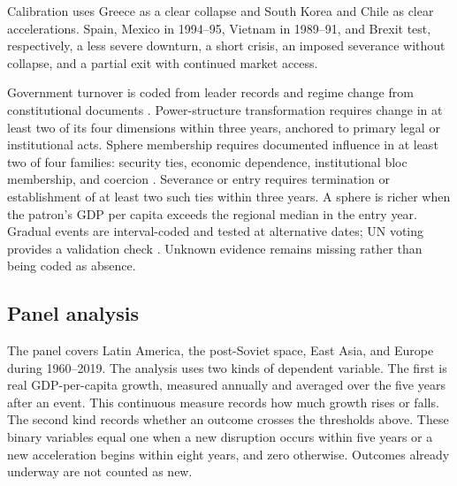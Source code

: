 \documentclass[11pt]{article}
\begin{document}
Calibration uses Greece as a clear collapse and South Korea and Chile as clear accelerations. Spain, Mexico in 1994--95, Vietnam in 1989--91, and Brexit test, respectively, a less severe downturn, a short crisis, an imposed severance without collapse, and a partial exit with continued market access.

Government turnover is coded from leader records and regime change from constitutional documents \parencite{goemans_gleditsch_chiozza_2009,elkins_ginsburg_melton_2009}. Power-structure transformation requires change in at least two of its four dimensions within three years, anchored to primary legal or institutional acts. Sphere membership requires documented influence in at least two of four families: security ties, economic dependence, institutional bloc membership, and coercion \parencite{keal_1983,leeds_etal_2002,gibler_sarkees_2004,felbermayr_etal_2020}. Severance or entry requires termination or establishment of at least two such ties within three years. A sphere is richer when the patron's GDP per capita exceeds the regional median in the entry year. Gradual events are interval-coded and tested at alternative dates; UN voting provides a validation check \parencite{bailey_strezhnev_voeten_2017}. Unknown evidence remains missing rather than being coded as absence.

\subsection{Panel analysis}

The panel covers Latin America, the post-Soviet space, East Asia, and Europe during 1960--2019. The analysis uses two kinds of dependent variable. The first is real GDP-per-capita growth, measured annually and averaged over the five years after an event. This continuous measure records how much growth rises or falls. The second kind records whether an outcome crosses the thresholds above. These binary variables equal one when a new disruption occurs within five years or a new acceleration begins within eight years, and zero otherwise. Outcomes already underway are not counted as new.
\end{document}
